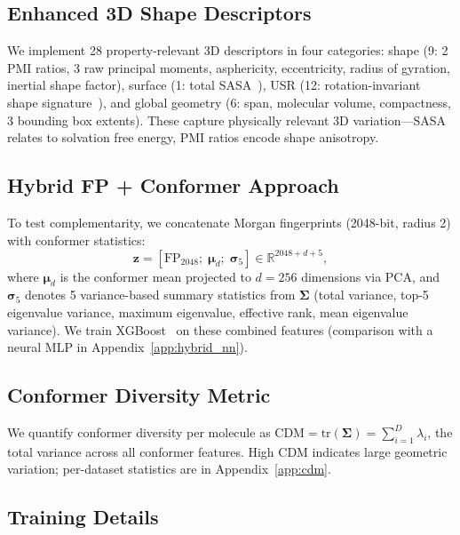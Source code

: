 \documentclass[sigconf]{acmart}
\begin{document}
\subsection{Enhanced 3D Shape Descriptors}
\label{sec:3d_methods}

We implement 28 property-relevant 3D descriptors in four categories: shape (9: 2 PMI ratios, 3 raw principal moments, asphericity, eccentricity, radius of gyration, inertial shape factor), surface (1: total SASA~\cite{freesasa2016}), USR (12: rotation-invariant shape signature~\cite{ballester2007usr}), and global geometry (6: span, molecular volume, compactness, 3 bounding box extents). These capture physically relevant 3D variation---SASA relates to solvation free energy, PMI ratios encode shape anisotropy.

\subsection{Hybrid FP + Conformer Approach}

To test complementarity, we concatenate Morgan fingerprints (2048-bit, radius 2) with conformer statistics:
\begin{equation}
    \mathbf{z} = [\text{FP}_{2048};\; \boldsymbol{\mu}_{d};\; \boldsymbol{\sigma}_5] \in \mathbb{R}^{2048 + d + 5},
\end{equation}
where $\boldsymbol{\mu}_d$ is the conformer mean projected to $d{=}256$ dimensions via PCA, and $\boldsymbol{\sigma}_5$ denotes 5 variance-based summary statistics from $\boldsymbol{\Sigma}$ (total variance, top-5 eigenvalue variance, maximum eigenvalue, effective rank, mean eigenvalue variance). We train XGBoost~\cite{chen2016xgboost} on these combined features (comparison with a neural MLP in Appendix~\ref{app:hybrid_nn}).

\subsection{Conformer Diversity Metric}

We quantify conformer diversity per molecule as $\text{CDM} = \text{tr}(\boldsymbol{\Sigma}) = \sum_{i=1}^{D} \lambda_i$, the total variance across all conformer features. High CDM indicates large geometric variation; per-dataset statistics are in Appendix~\ref{app:cdm}.

\subsection{Training Details}
\end{document}
